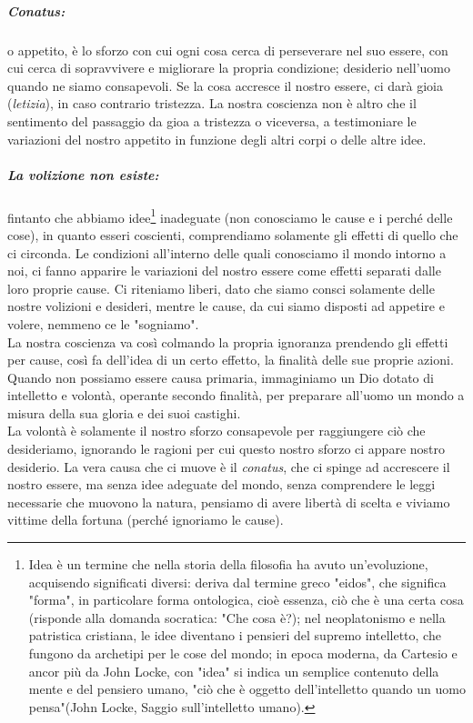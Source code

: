 \subparagraph{Conatus:} o appetito, è lo sforzo con cui ogni cosa cerca di perseverare nel suo essere, con cui cerca di sopravvivere e migliorare la propria condizione; desiderio nell'uomo quando ne siamo consapevoli. Se la cosa accresce il nostro essere, ci darà gioia (\textit{letizia}), in caso contrario tristezza. La nostra coscienza non è altro che il sentimento del passaggio da gioa a tristezza o viceversa, a testimoniare le variazioni del nostro appetito in funzione degli altri corpi o delle altre idee.
\subparagraph{La volizione non esiste:}fintanto che abbiamo idee\footnote{Idea è un termine che nella storia della filosofia ha avuto un'evoluzione, acquisendo significati diversi: deriva dal termine greco "eidos", che significa "forma", in particolare forma ontologica, cioè essenza, ciò che è una certa cosa (risponde alla domanda socratica: "Che cosa è?); nel neoplatonismo e nella patristica cristiana, le idee diventano i pensieri del supremo intelletto, che fungono da archetipi per le cose del mondo; in epoca moderna, da Cartesio e ancor più da John Locke, con "idea" si indica un semplice contenuto della mente e del pensiero umano, "ciò che è oggetto dell'intelletto quando un uomo pensa"(John Locke, Saggio sull'intelletto umano).} inadeguate (non conosciamo le cause e i perché delle cose), in quanto esseri coscienti, comprendiamo solamente gli effetti di quello che ci circonda. Le condizioni all'interno delle quali conosciamo il mondo intorno a noi, ci fanno apparire le variazioni del nostro essere come effetti separati dalle loro proprie cause. Ci riteniamo liberi, dato che siamo consci solamente delle nostre volizioni e desideri, mentre le cause, da cui siamo disposti ad appetire e volere, nemmeno ce le "sogniamo".\\
La nostra coscienza va così colmando la propria ignoranza prendendo gli effetti per cause, così fa dell'idea di un certo effetto, la finalità delle sue proprie azioni. Quando non possiamo essere causa primaria, immaginiamo un Dio dotato di intelletto e volontà, operante secondo finalità, per preparare all'uomo un mondo a misura della sua gloria e dei suoi castighi.\\
La volontà è solamente il nostro sforzo consapevole per raggiungere ciò che desideriamo, ignorando le ragioni per cui questo nostro sforzo ci appare nostro desiderio. La vera causa che ci muove è il \textit{conatus}, che ci spinge ad accrescere il nostro essere, ma senza idee adeguate del mondo, senza comprendere le leggi necessarie che muovono la natura, pensiamo di avere libertà di scelta e viviamo vittime della fortuna (perché ignoriamo le cause).
